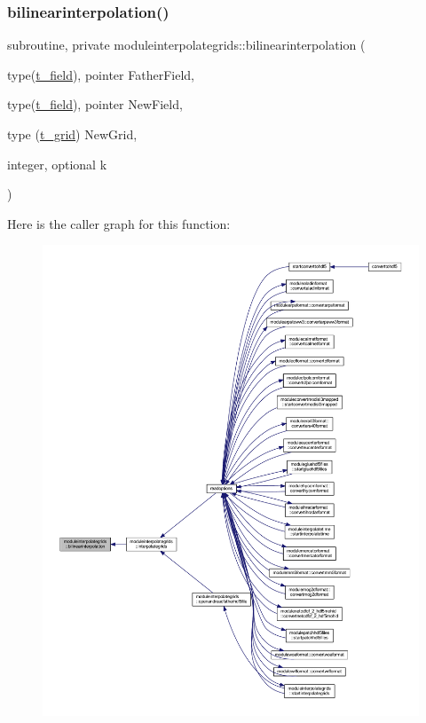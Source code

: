 \subsubsection{\texorpdfstring{bilinearinterpolation()}{bilinearinterpolation()}}
{\footnotesize\ttfamily subroutine, private moduleinterpolategrids\+::bilinearinterpolation (\begin{DoxyParamCaption}\item[{type(\mbox{\hyperlink{structmoduleinterpolategrids_1_1t__field}{t\+\_\+field}}), pointer}]{Father\+Field,  }\item[{type(\mbox{\hyperlink{structmoduleinterpolategrids_1_1t__field}{t\+\_\+field}}), pointer}]{New\+Field,  }\item[{type (\mbox{\hyperlink{structmoduleinterpolategrids_1_1t__grid}{t\+\_\+grid}})}]{New\+Grid,  }\item[{integer, optional}]{k }\end{DoxyParamCaption})\hspace{0.3cm}{\ttfamily [private]}}

Here is the caller graph for this function\+:\nopagebreak
\begin{figure}[H]
\begin{center}
\leavevmode
\includegraphics[width=350pt]{namespacemoduleinterpolategrids_aa9562e1a85edb00f05d06ebe2ec3f113_icgraph}
\end{center}
\end{figure}
\mbox{\label{namespacemoduleinterpolategrids_ad1fbdcc1429662d0522479b1e7933859}} 
